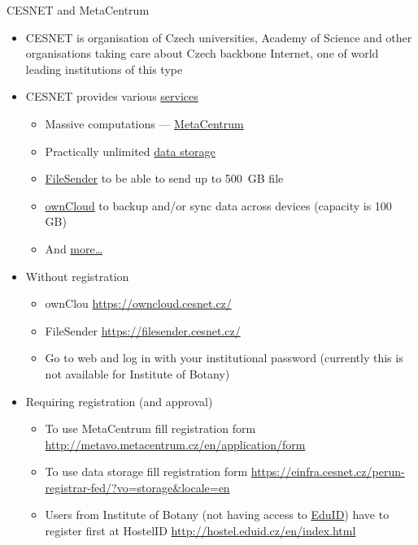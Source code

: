 \documentclass[hyperref={bookmarks=true, unicode=true, colorlinks=true, pdftitle={Linux, command line and MetaCentrum}, plainpages=false, pdfauthor={Vojtech Zeisek}, pdfsubject={Course about use of Linux command line, writing shell scripts and using MetaCentrum of CESNET}, pdfcreator={XeLaTeX, http://www.xelatex.org/}, pdfkeywords={Linux, GNU, BASH, shell, command line, MetaCentrum}, linkcolor=Sienna, anchorcolor=black, citecolor=green, filecolor=magenta, menucolor=Sienna, urlcolor=cyan, pdftex}, compress, ucs, xelatex, xcolor=svgnames, 11pt]{beamer}
\begin{document}
\begin{frame}[allowframebreaks]{CESNET and MetaCentrum}
\begin{itemize}
  \item CESNET is organisation of Czech universities, Academy of Science and other organisations taking care about Czech backbone Internet, one of world leading institutions of this type
  \item CESNET provides various \href{http://www.cesnet.cz/services/?lang=en}{services}
  \begin{itemize}
    \item Massive computations --- \href{http://www.cesnet.cz/services/massive-computations-metacentrum/?lang=en}{MetaCentrum}
    \item Practically unlimited \href{http://www.cesnet.cz/services/data-storage/?lang=en}{data storage}
    \item \href{http://www.cesnet.cz/services/filesender/?lang=en}{FileSender} to be able to send up to 500~GB file
    \item \href{http://www.cesnet.cz/services/owncloud/?lang=en}{ownCloud} to backup and/or sync data across devices (capacity is 100 GB)
    \item And \href{http://www.cesnet.cz/services/?lang=en}{more\ldots}
  \end{itemize}
  \item Without registration
  \begin{itemize}
    \item ownClou \href{https://owncloud.cesnet.cz/}{https://owncloud.cesnet.cz/}
    \item FileSender \href{https://filesender.cesnet.cz/}{https://filesender.cesnet.cz/}
    \item Go to web and log in with your institutional password (currently this is not available for Institute of Botany)
  \end{itemize}
  \item Requiring registration (and approval)
  \begin{itemize}
    \item To use MetaCentrum fill registration form \href{http://metavo.metacentrum.cz/en/application/form}{http://metavo.metacentrum.cz/en/application/form}
    \item To use data storage fill registration form \href{https://einfra.cesnet.cz/perun-registrar-fed/?vo=storage&locale=en}{https://einfra.cesnet.cz/perun-registrar-fed/?vo=storage\&locale=en}
    \item Users from Institute of Botany (not having access to \href{https://www.eduid.cz/en/index}{EduID}) have to register first at HostelID \href{http://hostel.eduid.cz/en/index.html}{http://hostel.eduid.cz/en/index.html}

\end{itemize}
\end{itemize}
\end{frame}
\end{document}
